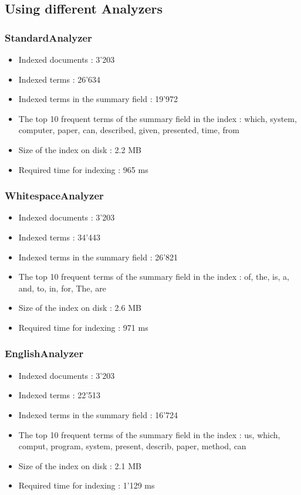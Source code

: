 \documentclass[11pt,a4paper,twoside,svgnames]{article}
\begin{document}
	\subsection{Using different Analyzers}
	\subsubsection{StandardAnalyzer}
	\begin{itemize}
		\item Indexed documents : 3'203
		\item Indexed terms : 26'634
		\item Indexed terms in the summary field : 19'972
		\item The top 10 frequent terms of the summary field in the index : which, system, computer, paper, can, described, given, presented, time, from
		\item Size of the index on disk : 2.2 MB
		\item Required time for indexing : 965 ms
	\end{itemize}

	\subsubsection{WhitespaceAnalyzer}
\begin{itemize}
	\item Indexed documents : 3'203
	\item Indexed terms : 34'443
	\item Indexed terms in the summary field : 26'821
	\item The top 10 frequent terms of the summary field in the index : of, the, is, a, and, to, in, for, The, are
	\item Size of the index on disk : 2.6 MB
	\item Required time for indexing : 971 ms
\end{itemize}

	\subsubsection{EnglishAnalyzer}
\begin{itemize}
	\item Indexed documents : 3'203
	\item Indexed terms : 22'513
	\item Indexed terms in the summary field : 16'724
	\item The top 10 frequent terms of the summary field in the index : us, which, comput, program, system, present, describ, paper, method, can
	\item Size of the index on disk : 2.1 MB
	\item Required time for indexing : 1'129 ms
\end{itemize}
\end{document}

